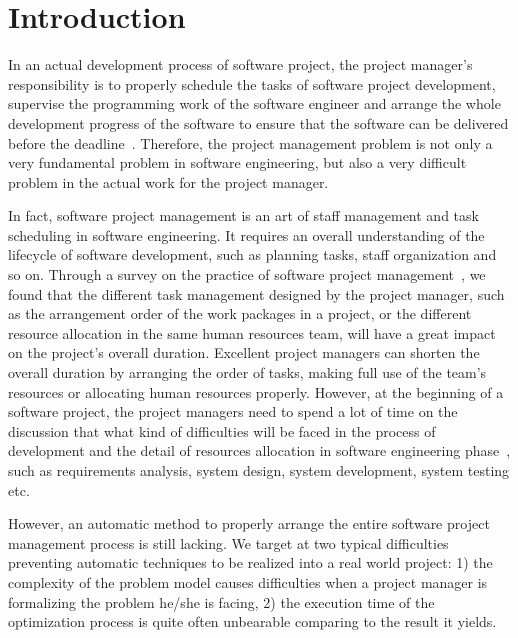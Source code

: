 \section{Introduction}
\vspace{-2mm}
%
In an actual
development process of software project, the project manager's responsibility is
to properly schedule the tasks of software project development, supervise the
programming work of the software engineer and arrange the whole development
progress of the software to ensure that the software can be delivered before the
deadline~\cite{stellman}. 
Therefore, the project management problem is not only
a very fundamental problem in software engineering, but also a very difficult
problem in the actual work for the project manager.

In fact, software project management is an art of staff management and task scheduling in software engineering. It requires an overall understanding of the lifecycle of software development, such as planning tasks, staff organization and so on. 
Through a survey on the practice of software project management~\cite{chang,alba,ren,penta}, we found that the different task management designed by the project manager, such as  the arrangement order of the work packages in a project, or the different  resource allocation in the same human resources team, will have a great  impact on the project's overall duration.
Excellent project managers can  shorten the overall duration by arranging the order of tasks, making full use  of the team's resources or allocating human resources properly. However, at the beginning of a software project, the project managers need to spend a lot  of time on the discussion that what kind of difficulties will be faced in the process of development and the detail of resources allocation in  software engineering phase~\cite{pentico}, such as requirements analysis, system design, system development, system testing etc. 

However, an automatic method to properly arrange the entire software project management process is still lacking. 
We target at two typical difficulties preventing automatic techniques to be realized into a real world project: 
1) the complexity of the problem model causes difficulties when a project manager is formalizing the problem he\slash she is facing, 
2) the execution time of the optimization process is quite often unbearable comparing to the result it yields. 

